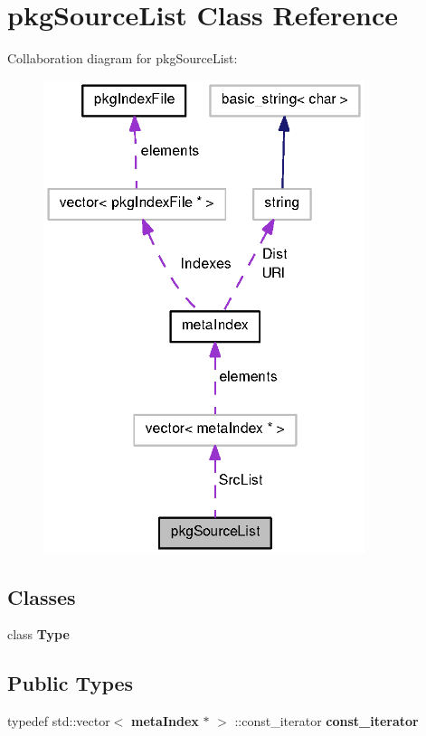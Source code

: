 \section{pkg\-Source\-List \-Class \-Reference}
\label{classpkgSourceList}


\-Collaboration diagram for pkg\-Source\-List\-:
\nopagebreak
\begin{figure}[H]
\begin{center}
\leavevmode
\includegraphics[width=266pt]{classpkgSourceList__coll__graph}
\end{center}
\end{figure}
\subsection*{\-Classes}
\begin{DoxyCompactItemize}
\item 
class {\bf \-Type}
\end{DoxyCompactItemize}
\subsection*{\-Public \-Types}
\begin{DoxyCompactItemize}
\item 
typedef std\-::vector$<$ {\bf meta\-Index} $\ast$ $>$\*
\-::const\-\_\-iterator {\bfseries const\-\_\-iterator}\label{classpkgSourceList_ae8a9c2a068c29c4b2fdd461de97c6435}

\end{DoxyCompactItemize}
